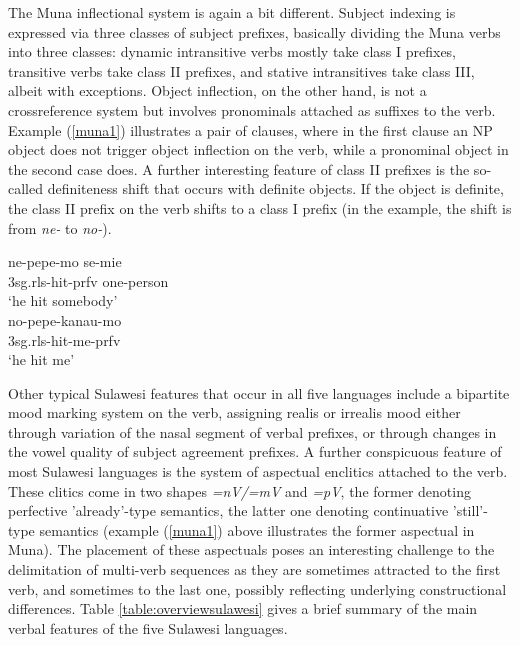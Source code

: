 The Muna inflectional system is again a bit different. Subject indexing is expressed via three classes of subject prefixes, basically dividing the Muna verbs into three classes: dynamic intransitive verbs mostly take class I prefixes, transitive verbs take class II prefixes, and stative intransitives take class III, albeit with exceptions. Object inflection, on the other hand, is not a crossreference system but involves pronominals attached as suffixes to the verb. Example (\ref{muna1}) illustrates a pair of clauses, where in the first clause an NP object does not trigger object inflection on the verb, while a pronominal object in the second case does. A further interesting feature of class II prefixes is the so-called definiteness shift that occurs with definite objects. If the object is definite, the class II prefix on the verb shifts to a class I prefix (in the example, the shift is from \textit{ne-} to \textit{no-}).

\pex \label{muna1}
\a
\gll ne-pepe-mo se-mie \\
\acs{3}\acs{sg}.\acs{rls}-hit-\acs{prfv} one-person \\
\glft `he hit somebody' \\ 
\z
\a
\gll no-pepe-kanau-mo \\ 
\acs{3}\acs{sg}.\acs{rls}-hit-me-\acs{prfv} \\
\glft `he hit me' \\ 
\z
\xe

Other typical Sulawesi features that occur in all five languages include a bipartite mood marking system on the verb, assigning realis or irrealis mood either through variation of the nasal segment of verbal prefixes, or through changes in the vowel quality of subject agreement prefixes. A further conspicuous feature of most Sulawesi languages is the system of aspectual enclitics attached to the verb. These clitics come in two shapes \textit{=nV/=mV} and \textit{=pV}, the former denoting perfective 'already'-type semantics, the latter one denoting continuative 'still'-type semantics (example (\ref{muna1}) above illustrates the former aspectual in Muna). The placement of these aspectuals poses an interesting challenge to the delimitation of multi-verb sequences as they are sometimes attracted to the first verb, and sometimes to the last one, possibly reflecting underlying constructional differences. Table \ref{table:overviewsulawesi} gives a brief summary of the main verbal features of the five Sulawesi languages.

